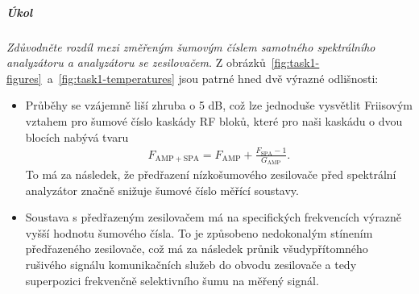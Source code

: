 \documentclass[11pt,a4paper]{article}
\begin{document}
\subparagraph*{Úkol} \emph{Zdůvodněte rozdíl mezi změřeným šumovým číslem samotného spektrálního analyzátoru a analyzátoru se zesilovačem.} Z obrázků~\ref{fig:task1-figures}~a~\ref{fig:task1-temperatures} jsou patrné hned dvě výrazné odlišnosti:
\begin{itemize}
    \item Průběhy se vzájemně liší zhruba o 5 dB, což lze jednoduše vysvětlit Friisovým vztahem pro šumové číslo kaskády RF bloků, které pro naši kaskádu o dvou blocích nabývá tvaru
    \begin{align}
        \label{eq:friis}
        F_{\mathrm{AMP+SPA}} = F_{\mathrm{AMP}} + \frac{F_{\mathrm{SPA}}-1}{G_{\mathrm{AMP}}}.
    \end{align}
    To má za následek, že předřazení nízkošumového zesilovače před spektrální analyzátor značně snižuje šumové číslo měřící soustavy.
    \item Soustava s předřazeným zesilovačem má na specifických frekvencích výrazně vyšší hodnotu šumového čísla. To je způsobeno nedokonalým stínením předřazeného zesilovače, což má za následek průnik všudypřítomného rušivého signálu komunikačních služeb do obvodu zesilovače a tedy superpozici frekvenčně selektivního šumu na měřený signál.
\end{itemize}


\end{document}
